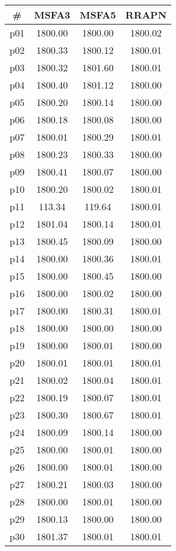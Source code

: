 \begin{tabular}{cccc}
\toprule
\textbf{\#} & \textbf{MSFA3} & \textbf{MSFA5} & \textbf{RRAPN}\\
\midrule
p01 & 1800.00 & 1800.00 & 1800.02\\
p02 & 1800.33 & 1800.12 & 1800.01\\
p03 & 1800.32 & 1801.60 & 1800.01\\
p04 & 1800.40 & 1801.12 & 1800.00\\
p05 & 1800.20 & 1800.14 & 1800.00\\
p06 & 1800.18 & 1800.08 & 1800.00\\
p07 & 1800.01 & 1800.29 & 1800.01\\
p08 & 1800.23 & 1800.33 & 1800.00\\
p09 & 1800.41 & 1800.07 & 1800.00\\
p10 & 1800.20 & 1800.02 & 1800.01\\
p11 & 113.34 & 119.64 & 1800.01\\
p12 & 1801.04 & 1800.14 & 1800.01\\
p13 & 1800.45 & 1800.09 & 1800.00\\
p14 & 1800.00 & 1800.36 & 1800.01\\
p15 & 1800.00 & 1800.45 & 1800.00\\
p16 & 1800.00 & 1800.02 & 1800.00\\
p17 & 1800.00 & 1800.31 & 1800.01\\
p18 & 1800.00 & 1800.00 & 1800.00\\
p19 & 1800.00 & 1800.01 & 1800.00\\
p20 & 1800.01 & 1800.01 & 1800.01\\
p21 & 1800.02 & 1800.04 & 1800.01\\
p22 & 1800.19 & 1800.07 & 1800.01\\
p23 & 1800.30 & 1800.67 & 1800.01\\
p24 & 1800.09 & 1800.14 & 1800.00\\
p25 & 1800.00 & 1800.01 & 1800.00\\
p26 & 1800.00 & 1800.01 & 1800.00\\
p27 & 1800.21 & 1800.03 & 1800.00\\
p28 & 1800.00 & 1800.01 & 1800.00\\
p29 & 1800.13 & 1800.00 & 1800.00\\
p30 & 1801.37 & 1800.01 & 1800.01\\
\bottomrule
\end{tabular}

